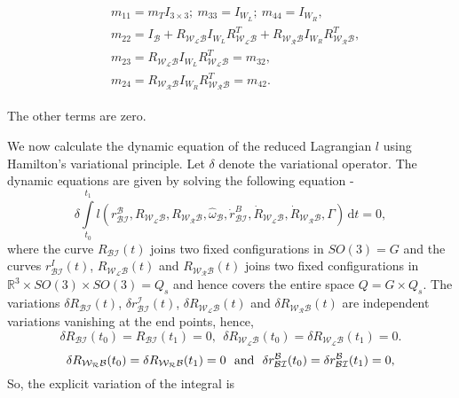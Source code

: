 \documentclass[letterpaper, 10 pt, conference]{ieeeconf}  \newcommand{\RN}[1]{\textup{\uppercase\expandafter{\romannumeral#1}}}
\begin{document}
\begin{align}\nonumber
\begin{split}
& m_{11} = m_{T}I_{3 \times 3}; ~ m_{33} = I_{W_L}; ~ m_{44} = I_{W_R}, \\
& m_{22}=I_\mathcal{B} + R_\mathcal{W_LB}I_{W_L}R_\mathcal{W_LB}^T + R_\mathcal{W_RB}I_{W_R}R_\mathcal{W_RB}^T, \\
& m_{23} = R_\mathcal{W_LB}I_{W_L}R_\mathcal{W_LB}^T = m_{32},\\
& m_{24} = R_\mathcal{W_RB}I_{W_R}R_\mathcal{W_RB}^T = m_{42}.
\end{split}
\end{align}

The other terms are zero.

We now calculate the dynamic equation of the reduced Lagrangian $\mathit{l}$ using Hamilton's variational principle. Let $\delta$ denote the variational operator. The dynamic equations are given by solving the following equation -
\begin{equation}\nonumber
\delta \int \limits^{t_{1}}_{t_{0}} l(r_{\mathcal{BI}}^{\mathcal{B}},R_{\mathcal{W_LB}}, R_{\mathcal{W_RB}},\widehat{\omega}_{\mathcal{B}},\dot{r}_{\mathcal{BI}}^{B},\dot{R}_{\mathcal{W_LB}},\dot{R}_{\mathcal{W_RB}},\Gamma)\, \mathrm dt=0,
\end{equation}
where the curve $R_{\mathcal{BI}}(t)$ joins two fixed configurations in $SO(3)=G$ and the curves $r_{\mathcal{BI}}^{I}(t)$, $R_{\mathcal{W_LB}}(t)$ and $R_{\mathcal{W_RB}}(t)$ joins two fixed configurations in $\mathbb{R}^{3} \times SO(3) \times SO(3) = Q_{s}$ and hence covers the entire space $Q=G \times Q_{s}$. The variations $\delta R_{\mathcal{BI}}(t)$, $\delta r_{\mathcal{BI}}^{\mathcal{I}}(t)$, $\delta R_{\mathcal{W_LB}}(t)$ and $\delta R_{\mathcal{W_RB}}(t)$ are independent variations vanishing at the end points, hence,
$$\delta R_{\mathcal{BI}}(t_{0})= R_{\mathcal{BI}}(t_{1})=0,~~ \delta R_{\mathcal{W_LB}}(t_{0})=\delta R_{\mathcal{W_LB}}(t_{1})=0.$$ $$\delta R_{\mathcal{W_RB}}(t_{0})=\delta R_{\mathcal{W_RB}}(t_{1})=0~~\hbox{and}~~\delta r_{\mathcal{BI}}^{\mathcal{B}} (t_{0})= \delta r_{\mathcal{BI}}^{\mathcal{B}} (t_{1})=0,$$
So, the explicit variation of the integral is
\end{document}
